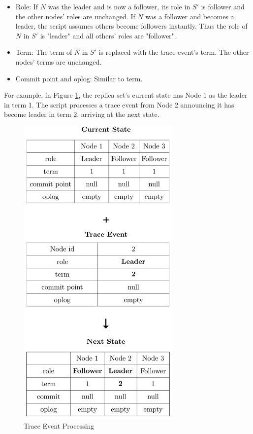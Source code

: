 \documentclass{vldb}
\begin{document}
\begin{itemize}
\item Role: If \ensuremath{N} was the leader and is now a follower, its role in \ensuremath{S'} is follower and the other nodes' roles are unchanged. If \ensuremath{N} was a follower and becomes a leader, the script assumes others become followers instantly. Thus the role of \ensuremath{N} in \ensuremath{S'} is "leader" and all others' roles are "follower".
\item Term: The term of \ensuremath{N} in \ensuremath{S'} is replaced with the trace event's term. The other nodes' terms are unchanged.
\item Commit point and oplog: Similar to term.
\end{itemize}

For example, in Figure \ref{figure:event-processing}, the replica set's current state has Node 1 as the leader in term 1. 
The script processes a trace event from Node 2 announcing it has become leader in term 2, arriving at the next state.

\begin{figure}
\includegraphics[width=8cm]{event-processing.png}
\caption{Trace Event Processing}
\label{figure:event-processing}
\end{figure}
\end{document}
